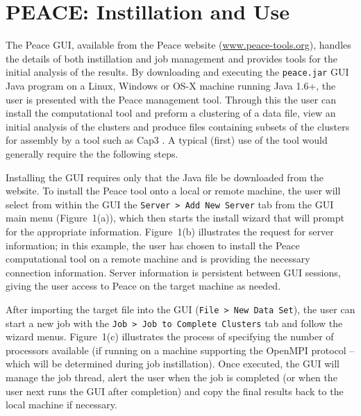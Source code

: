 \documentclass[a4,center,fleqn]{NAR}
\begin{document}
\enlargethispage{-65.1pt}

\section{PEACE: Instillation and Use}

The {\sc Peace} GUI, available from the {\sc Peace} website
(\href{http://www.peace-tools.org}{www.peace-tools.org}), handles the
details of both instillation and job management and provides tools for
the initial analysis of the results.  By downloading and executing the
{\tt peace.jar} GUI Java program on a Linux, Windows or OS-X machine
running Java 1.6+, the user is presented with the {\sc Peace}
management tool.  Through this the user can install the computational
tool and preform a clustering of a data file, view an initial analysis
of the clusters and produce files containing subsets of the clusters
for assembly by a tool such as {\sc Cap3} \cite{Huang99}.  A typical
(first) use of the tool would generally require the the following
steps.

 Installing the GUI requires only
that the Java file be downloaded from the website.  To install the {\sc
  Peace} tool onto a local or remote machine, the user will select
from within the GUI the {\tt Server > Add New Server} tab from the GUI
main menu (Figure~1(a)), which then starts the install
wizard that will prompt for the appropriate information.
Figure~1(b) illustrates the request for server information;
in this example, the user has chosen to install the {\sc Peace}
computational tool on a remote machine and is providing the necessary
connection information.  Server information is persistent between GUI
sessions, giving the user access to {\sc Peace} on the target machine
as needed.

 After importing the target file into
the GUI ({\tt File > New Data Set}), the user can start a new job with
the {\tt Job > Job to Complete Clusters} tab and follow the wizard
menus.  Figure~1(c) illustrates the process of specifying
the number of processors available (if running on a machine supporting
the OpenMPI protocol -- which will be determined during job
instillation).  Once executed, the GUI will manage the job thread,
alert the user when the job is completed (or when the user next
runs the GUI after completion) and 
copy the final results back to the local machine if necessary.
\end{document}
